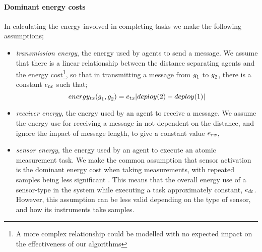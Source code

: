 \paragraph{Dominant energy costs}
\label{section:problem:dominant_energy_costs}
\newcommand{\formalTransmissionEnergy}[2]{
	\functionFormal{energy_{\symbolTransmission{}{}}}
	{\setAgent{}{} \times \setAgent{}{}}
	{\setRealNumbersPositive{}{}}
}
\newcommand{\functionTransmissionEnergy}[2]{
	\functionSignature{energy_{\symbolTransmission{}{}}}
	{\varAgent{#1}{},\varAgent{#2}{}}
}
\newcommand{\functionTransmissionEnergyIndexed}[2]{
	\functionTransmissionEnergy{\varAgent{i}{}}{\varAgent{i+1}{}}
}
\newcommand{\functionTransmissionEnergySink}[2]{
	\functionSignature{energy_{\symbolTransmission{}{}}}
	{\functionSinkRoleAtomic{}{},\varAgent{2}{}}
}
\newcommand{\functionTransmissionEnergyRelay}[2]{
	\functionSignature{energy_{\symbolTransmission{}{}}}
	{\varAgent{#1}{},\varAgent{#2}{}}
}
\newcommand{\functionTransmissionEnergyDetector}[2]{
	\functionSignature{energy_{\symbolTransmission{}{}}}
	{\varAgent{#1}{},\varAgent{#2}{}}
}
In calculating the energy involved in completing tasks we make the following assumptions;
\begin{itemize}
	\item \textit{transmission energy}, the energy used by agents to send a message. We assume that there is a linear relationship between the distance separating agents and the energy cost\footnote{A more complex relationship could be modelled with no expected impact on the effectiveness of our algorithms}, so that in transmitting a message from $g_{1}^{}$ to $g_{2}^{}$, there is a constant $\varTransmissionEnergy{}{}$ such that;
	\begin{equation}
		\functionTransmissionEnergy{1}{2}
		=  \varTransmissionEnergy{}{}\funcSize{\functionDeployment{2}{} - \functionDeployment{1}{}}
	\end{equation}
	\item \textit{receiver energy}, the energy used by an agent to receive a message. We assume the energy use for receiving a message in not dependent on the distance, and ignore the impact of message length, to give a constant value $\varReceiverEnergy{}{}$, 
	\item \textit{sensor energy}, the energy used by an agent to execute an atomic measurement task. We make the common assumption that sensor activation is the dominant energy cost when taking measurements, with repeated samples being less significant \citep{Razzaque2014}. This means that the overall energy use of a sensor-type in the system while executing a task approximately constant, $\varSensorEnergy{}{}$. However, this assumption can be less valid depending on the type of sensor, and how its instruments take samples.
\end{itemize}
